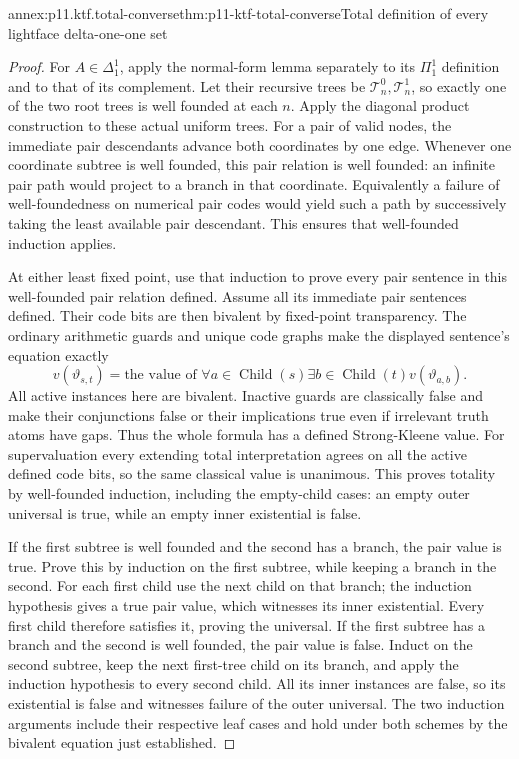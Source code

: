 \begin{annexitem}{annex:p11.ktf.total-converse}{thm:p11-ktf-total-converse}{Total definition of every lightface delta-one-one set}
\begin{proof}
For \(A\in\Delta^1_1\), apply the normal-form lemma separately
to its \(\Pi^1_1\) definition and to that of its complement.
Let their recursive trees be \(\mathcal T_n^0,\mathcal T_n^1\),
so exactly one of the two root trees is well founded at each \(n\).
Apply the diagonal product construction to these actual uniform
trees. For a pair of valid nodes, the immediate pair descendants
advance both coordinates by one edge. Whenever one coordinate
subtree is well founded, this pair relation is well founded: an
infinite pair path would project to a branch in that coordinate.
Equivalently a failure of well-foundedness on numerical pair codes
would yield such a path by successively taking the least available
pair descendant. This ensures that well-founded induction applies.

At either least fixed point, use that induction to prove every
pair sentence in this well-founded pair relation defined. Assume
all its immediate pair sentences defined. Their code bits are
then bivalent by fixed-point transparency. The ordinary arithmetic
guards and unique code graphs make the displayed sentence's
equation exactly
\[
 v(\vartheta_{s,t})=
   \text{the value of }\forall a\in\operatorname{Child}(s)
                   \exists b\in\operatorname{Child}(t)
                        v(\vartheta_{a,b}).
\]
All active instances here are bivalent. Inactive guards are
classically false and make their conjunctions false or their
implications true even if irrelevant truth atoms have gaps.
Thus the whole formula has a defined Strong-Kleene value.
For supervaluation every extending total interpretation agrees
on all the active defined code bits, so the same classical value
is unanimous. This proves totality by well-founded induction,
including the empty-child cases: an empty outer universal is
true, while an empty inner existential is false.

If the first subtree is well founded and the second has a branch,
the pair value is true. Prove this by induction on the first
subtree, while keeping a branch in the second. For each first
child use the next child on that branch; the induction hypothesis
gives a true pair value, which witnesses its inner existential.
Every first child therefore satisfies it, proving the universal.
If the first subtree has a branch and the second is well founded,
the pair value is false. Induct on the second subtree, keep the
next first-tree child on its branch, and apply the induction
hypothesis to every second child. All its inner instances are
false, so its existential is false and witnesses failure of the
outer universal. The two induction arguments include their
respective leaf cases and hold under both schemes by the
bivalent equation just established.


\end{proof}
\end{annexitem}
